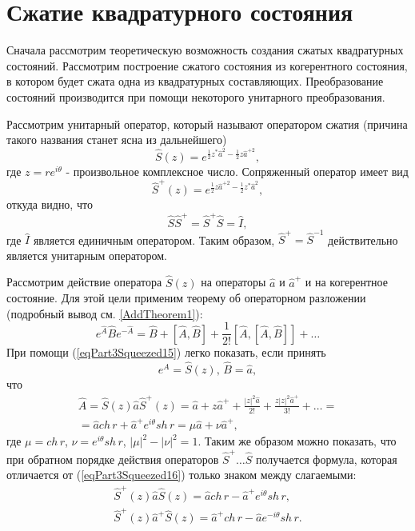 \section{Сжатие квадратурного состояния}
Сначала рассмотрим теоретическую возможность создания сжатых
квадратурных состояний. Рассмотрим построение сжатого состояния из
когерентного состояния, в котором будет сжата одна из квадратурных
составляющих. Преобразование состояний производится при помощи
некоторого унитарного преобразования.

Рассмотрим унитарный оператор, который называют оператором сжатия
(причина такого названия станет ясна из дальнейшего)
\begin{equation}
\hat{S}\left(z\right) = e^{\frac{1}{2}z^{*}\hat{a}^2 -
\frac{1}{2}z\hat{a}^{+2}},
\nonumber
\end{equation}
где $z = r e^{i\theta}$ - произвольное комплексное число.
Сопряженный оператор имеет вид
\begin{equation}
\hat{S}^{+}\left(z\right) = e^{\frac{1}{2}z\hat{a}^{+2} -
\frac{1}{2}z^{*}\hat{a}^{2}}, 
\nonumber
\end{equation}
откуда видно, что
\begin{equation}
\hat{S} \hat{S}^{+} = \hat{S}^{+} \hat{S} = \hat{I},
\nonumber
\end{equation}
где $\hat{I}$ является единичным оператором. Таким образом, $\hat{S}^{+} =
\hat{S}^{-1}$ действительно является унитарным оператором.

Рассмотрим действие оператора $\hat{S}\left(z\right)$ на операторы
$\hat{a}$ и $\hat{a}^{+}$ и на когерентное состояние. Для этой цели
применим теорему об операторном разложении (подробный вывод
см. \autoref{AddTheorem1}):  
\begin{equation}
e^{\hat{A}}\hat{B}e^{-\hat{A}} = 
\hat{B} + \left[\hat{A},\hat{B}\right] + 
\frac{1}{2!} \left[\hat{A},\left[\hat{A},\hat{B}\right]\right] + \dots
\label{eqPart3Squeezed15}
\end{equation}
При помощи (\ref{eqPart3Squeezed15}) легко показать, если принять
\[
e^{\hat{A}} = \hat{S}\left(z\right), \, \hat{B} = \hat{a},
\]
что
\begin{eqnarray}
\hat{A} = \hat{S}\left(z\right)\hat{a}\hat{S}^{+}\left(z\right) =
\hat{a} + z \hat{a}^{+} + \frac{\left|z\right|^2\hat{a}}{2!} +
\frac{z\left|z\right|^2\hat{a}^{+}}{3!} + \dots = 
\nonumber \\
=\hat{a} ch\,r + \hat{a}^{+} e^{i\theta} sh \, r = 
\mu \hat{a} + \nu \hat{a}^{+},
\label{eqPart3Squeezed16}
\end{eqnarray}
где $\mu = ch\,r$, $\nu = e^{i\theta} sh\,r$, $\left|\mu\right|^2 -
\left|\nu\right|^2  = 1$.
Таким же образом можно показать, что при обратном порядке действия
операторов $\hat{S}^{+}\dots\hat{S}$ получается формула, которая
отличается от (\ref{eqPart3Squeezed16}) только знаком между
слагаемыми:
\begin{eqnarray}
\hat{S}^{+}\left(z\right)\hat{a}\hat{S}\left(z\right) 
=\hat{a} ch\,r - \hat{a}^{+} e^{i\theta} sh \, r,
\nonumber \\
\hat{S}^{+}\left(z\right)\hat{a}^{+}\hat{S}\left(z\right) 
=\hat{a}^{+} ch\,r - \hat{a} e^{-i\theta} sh \, r.
\label{eqPart3Squeezed16a}
\end{eqnarray}

